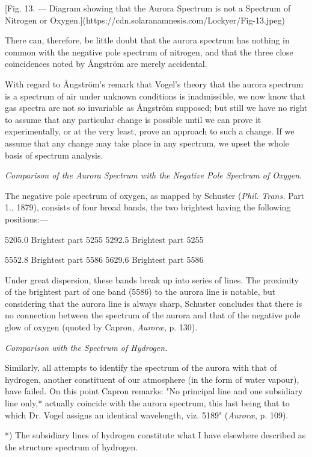\documentclass[a4paper, 12pt, oneside, polutonikogreek, english]{article}
\begin{document}
[Fig. 13. --- Diagram showing that the Aurora Spectrum is not a Spectrum of Nitrogen or Oxygen.](https://cdn.solaranamnesis.com/Lockyer/Fig-13.jpeg)

There can, therefore, be little doubt that the aurora spectrum has nothing in common with the negative pole spectrum of nitrogen, and that the three close coincidences noted by Ångström are merely accidental.

With regard to Ångström's remark that Vogel's theory that the aurora spectrum is a spectrum of air under unknown conditions is inadmissible, we now know that gas spectra are not so invariable as Ångström supposed; but still we have no right to assume that any particular change is possible until we can prove it experimentally, or at the very least, prove an approach to such a change. If we assume that any change may take place in any spectrum, we upset the whole basis of spectrum analysis.

\emph{Comparison of the Aurora Spectrum with the Negative Pole Spectrum of Oxygen.}

The negative pole spectrum of oxygen, as mapped by Schuster (\emph{Phil. Trans.} Part 1., 1879), consists of four broad bands, the two brightest having the following positions:---

5205.0 Brightest part 5255 
5292.5 Brightest part 5255

5552.8 Brightest part 5586 
5629.6 Brightest part 5586

Under great dispersion, these bands break up into series of lines. The proximity of the brightest part of one band (5586) to the aurora line is notable, but considering that the aurora line is always sharp, Schuster concludes that there is no connection between the spectrum of the aurora and that of the negative pole glow of oxygen (quoted by Capron, \emph{Auroræ}, p. 130).

\emph{Comparison with the Spectrum of Hydrogen.}

Similarly, all attempts to identify the spectrum of the aurora with that of hydrogen, another constituent of our atmosphere (in the form of water vapour), have failed. On this point Capron remarks: "No principal line and one subsidiary line only,* actually coincide with the aurora spectrum, this last being that to which Dr. Vogel assigns an identical wavelength, viz. 5189" (\emph{Auroræ}, p. 109).

*) The subsidiary lines of hydrogen constitute what I have elsewhere described as the structure spectrum of hydrogen.
\end{document}
